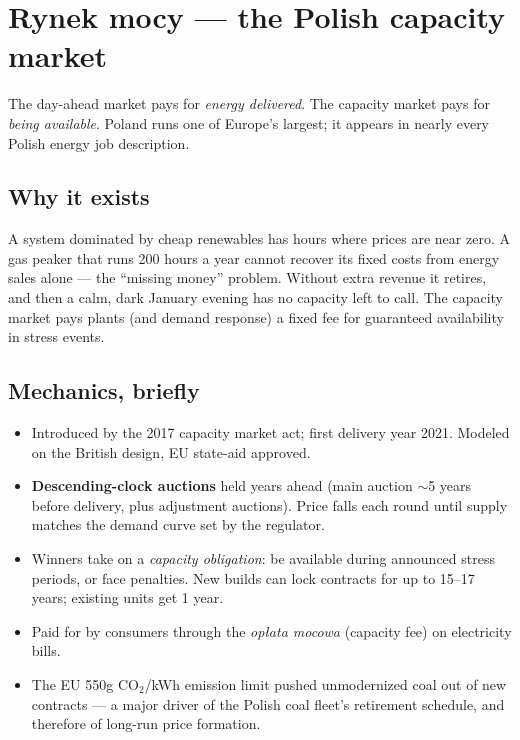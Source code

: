 \section{Rynek mocy --- the Polish capacity market}

The day-ahead market pays for \emph{energy delivered}. The capacity
market pays for \emph{being available}. Poland runs one of Europe's
largest; it appears in nearly every Polish energy job description.

\subsection{Why it exists}

A system dominated by cheap renewables has hours where prices are near
zero. A gas peaker that runs 200 hours a year cannot recover its fixed
costs from energy sales alone --- the ``missing money'' problem. Without
extra revenue it retires, and then a calm, dark January evening has no
capacity left to call. The capacity market pays plants (and demand
response) a fixed fee for guaranteed availability in stress events.

\subsection{Mechanics, briefly}

\begin{itemize}
  \item Introduced by the 2017 capacity market act; first delivery year
        2021. Modeled on the British design, EU state-aid approved.
  \item \textbf{Descending-clock auctions} held years ahead (main
        auction $\sim$5 years before delivery, plus adjustment
        auctions). Price falls each round until supply matches the
        demand curve set by the regulator.
  \item Winners take on a \emph{capacity obligation}: be available
        during announced stress periods, or face penalties. New builds
        can lock contracts for up to 15--17 years; existing units get
        1 year.
  \item Paid for by consumers through the \emph{op\l{}ata mocowa}
        (capacity fee) on electricity bills.
  \item The EU 550g CO$_2$/kWh emission limit pushed unmodernized coal
        out of new contracts --- a major driver of the Polish coal fleet's
        retirement schedule, and therefore of long-run price formation.
\end{itemize}

